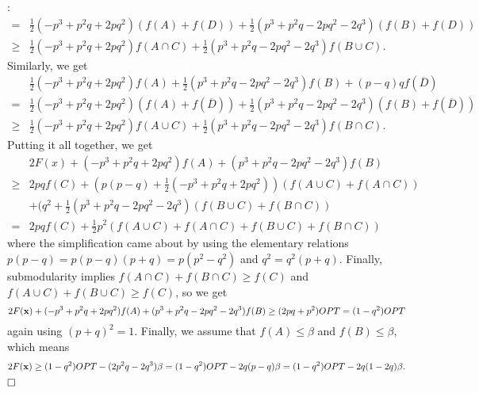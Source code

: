 \documentclass{article}[11pt]
\renewenvironment{proof}{\noindent{\bf Proof}:~}{$\hfill \Box$\\}
\def\bx{{\bf x}}
\begin{document}
\begin{proof}
\begin{eqnarray*}
 = & \frac12 (-p^3 + p^2 q + 2pq^2) (f(A) + f(D)) + \frac12 (p^3 + p^2 q -2pq^2 -2q^3) (f(B) + f(D)) \\
 \geq & \frac12 (-p^3 + p^2 q + 2pq^2) f(A \cap C) + \frac12 (p^3 + p^2 q -2pq^2 -2q^3) f(B \cup C).
\end{eqnarray*}
Similarly, we get
\begin{eqnarray*}
 & \frac12 (-p^3 + p^2 q + 2pq^2) f(A) + \frac12 (p^3 + p^2 q -2pq^2 -2q^3) f(B) + (p-q)q f(\overline{D}) \\
 = & \frac12 (-p^3 + p^2 q + 2pq^2) (f(A) + f(\overline{D})) + \frac12 (p^3 + p^2 q -2pq^2 -2q^3) (f(B) + f(\overline{D})) \\
 \geq & \frac12 (-p^3 + p^2 q + 2pq^2) f(A \cup C) + \frac12 (p^3 + p^2 q -2pq^2 -2q^3) f(B \cap C).
\end{eqnarray*}
Putting it all together, we get
\begin{eqnarray*}
& 2 F(x) + (-p^3 + p^2 q + 2pq^2) f(A) + (p^3 + p^2 q -2pq^2 -2q^3) f(B) \\
\geq & 2pq f(C) + (p(p-q) + \frac12 (-p^3 + p^2 q + 2pq^2)) (f(A \cup C) + f(A \cap C)) \\
 & + (q^2 + \frac12 (p^3 + p^2 q - 2pq^2 - 2q^3) (f(B \cup C) + f(B \cap C)) \\
 = & 2pq f(C) + \frac12 p^2 (f(A \cup C) + f(A \cap C) + f(B \cup C) + f(B \cap C))
 \end{eqnarray*}
where the simplification came about by using the elementary relations
 $p(p-q) = p(p-q)(p+q) = p(p^2-q^2)$ and $q^2 = q^2 (p+q)$.
Finally, submodularity implies $f(A \cap C) + f(B \cap C) \geq f(C)$
and $f(A \cup C) + f(B \cup C) \geq f(C)$, so we get
$$ 2 F(\bx) + (-p^3 + p^2 q + 2pq^2) f(A) + (p^3 + p^2 q -2pq^2 -2q^3) f(B) \geq (2pq + p^2) OPT
 = (1-q^2) OPT $$
again using $(p+q)^2 = 1$.
Finally, we assume that $f(A) \leq \beta$ and $f(B) \leq \beta$, which means
$$ 2 F(\bx) \geq (1-q^2) OPT - (2p^2 q - 2q^3) \beta = (1-q^2) OPT - 2q (p-q) \beta
 = (1-q^2) OPT - 2q (1-2q) \beta.$$
\end{proof}
\fi
\end{document}

